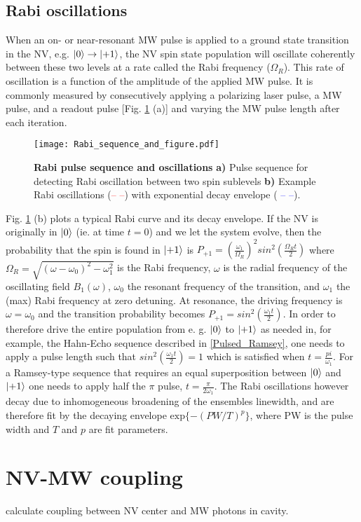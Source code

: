 \subsection{Rabi oscillations}

When an on- or near-resonant MW pulse is applied to a ground state transition in the NV, e.g. $\ket{0} \rightarrow \ket{+1}$, the NV spin state population will oscillate coherently between these two levels at a rate called the Rabi frequency ($\Omega_R$). This rate of oscillation is a function of the amplitude of the applied MW pulse. It is commonly measured by consecutively applying a polarizing laser pulse, a MW pulse, and a readout pulse [Fig. \ref{Fig1_3} (a)] and varying the MW pulse length after each iteration. 

\begin{figure}[t!]
\centering
\texttt{[image: Rabi\_sequence\_and\_figure.pdf]}  
\caption{\textbf{Rabi pulse sequence and oscillations} \textbf{a)} Pulse sequence for detecting Rabi oscillation between two spin sublevels \textbf{b)} Example Rabi oscillations (\textcolor{red}{-- --}) with exponential decay envelope (\textcolor{blue}{ -- --}).}
\label{Fig1_3}
\end{figure}

Fig. \ref{Fig1_3} (b) plots a typical Rabi curve and its decay envelope. If the NV is originally in $\ket{0}$ (ie. at time $t = 0$) and we let the system evolve, then the probability that the spin is found in $\ket{+1}$ is $P_{+1} = \left(\frac{\omega_1}{\Omega_R}\right)^2 sin^2\left(\frac{\Omega_R t}{2}\right)$ where $\Omega_R = \sqrt{(\omega-\omega_0)^2-\omega_1^2}$ is the Rabi frequency, $\omega$ is the radial frequency of the oscillating field $B_1(\omega)$, $\omega_0$ the resonant frequency of the transition, and $\omega_1$ the (max) Rabi frequency at zero detuning. At resonance, the driving frequency is $\omega = \omega_0$ and the transition probability becomes $P_{+1} = sin^2\left(\frac{\omega_1 t}{2}\right)$. In order to therefore drive the entire population from e. g. $\ket{0}$ to $\ket{+1}$ as needed in, for example, the Hahn-Echo sequence described in \ref{Pulsed_Ramsey}, one needs to apply a pulse length such that $sin^2 \left(\frac{\omega_1 t}{2}\right) = 1$ which is satisfied when $t = \frac{pi}{\omega_1}$. For a Ramsey-type sequence that requires an equal superposition between $\ket{0}$ and $\ket{+1}$ one needs to apply half the $\pi$ pulse, $t = \frac{\pi}{2\omega_1}$. The Rabi oscillations however decay due to inhomogeneous broadening of the ensembles linewidth, and are therefore fit by the decaying envelope $\text{exp}\{-\left(PW/T\right)^p\}$, where PW is the pulse width and $T$ and $p$ are fit parameters.

\section{NV-MW coupling}

calculate coupling between NV center and MW photons in cavity.
